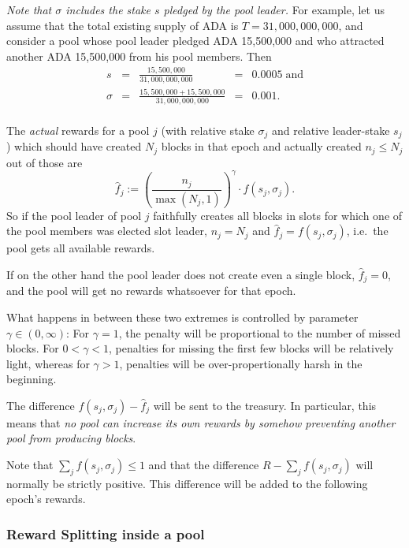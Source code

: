 \documentclass[11pt,a4paper]{article}
\begin{document}
\emph{Note that \(\sigma\) includes the stake \(s\) pledged by the pool
leader.} For example, let us assume that the total existing supply of
ADA is \(T=31,000,000,000\), and consider a pool whose pool leader
pledged ADA 15,500,000 and who attracted another ADA 15,500,000 from his
pool members. Then \[
\begin{array}{rcccl}
    s                  & = & \displaystyle\frac{15,500,000}{31,000,000,000}              & = & 0.0005\;\text{and} \\[5mm]
    \sigma & = & \displaystyle\frac{15,500,000 + 15,500,000}{31,000,000,000} & = & 0.001. \\
\end{array}
\]

The \emph{actual} rewards for a pool \(j\) (with relative stake
\(\sigma_j\) and relative leader-stake \(s_j\)) which should have
created \(N_j\) blocks in that epoch and actually created
\(n_j\leq N_j\) out of those are \[
    \hat{f}_j := \left(\frac{n_j}{\max(N_j, 1)}\right)^\gamma\cdot f(s_j,\sigma_j).
\] So if the pool leader of pool \(j\) faithfully creates all blocks in
slots for which one of the pool members was elected slot leader,
\(n_j=N_j\) and \(\hat{f}_j=f(s_j,\sigma_j)\), i.e.~the pool gets all
available rewards.

If on the other hand the pool leader does not create even a single
block, \(\hat{f}_j=0\), and the pool will get no rewards whatsoever for
that epoch.

What happens in between these two extremes is controlled by parameter
\(\gamma\in(0,\infty)\): For \(\gamma=1\), the penalty will be
proportional to the number of missed blocks. For \(0<\gamma<1\),
penalties for missing the first few blocks will be relatively light,
whereas for \(\gamma>1\), penalties will be over-propertionally harsh in
the beginning.

The difference \(f(s_j,\sigma_j)-\hat{f}_j\) will be sent to the
treasury. In particular, this means that \emph{no pool can increase its
own rewards by somehow preventing another pool from producing blocks}.

Note that \(\sum_jf(s_j,\sigma_j)\leq 1\) and that the difference
\(R-\sum_jf(s_j,\sigma_j)\) will normally be strictly positive. This
difference will be added to the following epoch's rewards.

\subsubsection{Reward Splitting inside a
pool}\label{reward-splitting-inside-a-pool}
\end{document}
